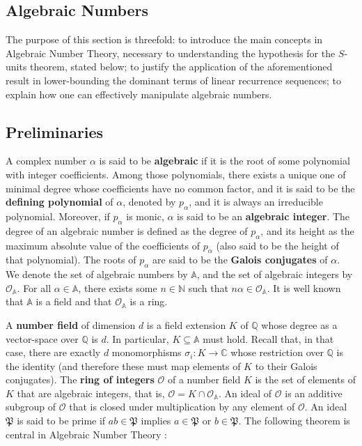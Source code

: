 
\subsection{Algebraic Numbers}

The purpose of this section is threefold: to introduce the main concepts in Algebraic Number Theory, necessary to understanding the hypothesis for the $S$-units theorem, stated below; to justify the application of the aforementioned result in lower-bounding the dominant terms of linear recurrence sequences; to explain how one can effectively manipulate algebraic numbers.

\subsection{Preliminaries}

A complex number $\alpha$ is said to be \textbf{algebraic} if it is the root of some polynomial with integer coefficients. Among those polynomials, there exists a unique one of minimal degree whose coefficients have no common factor, and it is said to be the \textbf{defining polynomial} of $\alpha$, denoted by $p_\alpha$, and it is always an irreducible polynomial. Moreover, if $p_\alpha$ is monic, $\alpha$ is said to be an \textbf{algebraic integer}. The degree of an algebraic number is defined as the degree of $p_\alpha$, and its height as the maximum absolute value of the coefficients of $p_\alpha$ (also said to be the height of that polynomial). The roots of $p_\alpha$ are said to be the \textbf{Galois conjugates} of $\alpha$. We denote the set of algebraic numbers by $\mathbb{A}$, and the set of algebraic integers by $\mathcal{O}_\mathbb{A}$. For all $\alpha\in\mathbb{A}$, there exists some $n\in\mathbb{N}$ such that $n\alpha\in\mathcal{O}_\mathbb{A}$. It is well known that $\mathbb{A}$ is a field and that $\mathcal{O}_\mathbb{A}$ is a ring.

A \textbf{number field} of dimension $d$ is a field extension $K$ of $\mathbb{Q}$ whose degree as a vector-space over $\mathbb{Q}$ is $d$. In particular, $K\subseteq\mathbb{A}$ must hold. Recall that, in that case, there are exactly $d$ monomorphisms $\sigma_i:K\rightarrow\mathbb{C}$ whose restriction over $\mathbb{Q}$ is the identity (and therefore these must map elements of $K$ to their Galois conjugates). The \textbf{ring of integers} $\mathcal{O}$ of a number field $K$ is the set of elements of $K$ that are algebraic integers, that is, $\mathcal{O}=K\cap\mathcal{O}_\mathbb{A}$. An ideal of $\mathcal{O}$ is an additive subgroup of $\mathcal{O}$ that is closed under multiplication by any element of $\mathcal{O}$. An ideal $\mathfrak{P}$ is said to be prime if $ab\in \mathfrak{P}$ implies $a\in\mathfrak{P}$ or $b\in\mathfrak{P}$. The following theorem is central in Algebraic Number Theory \cite{SnT}:

